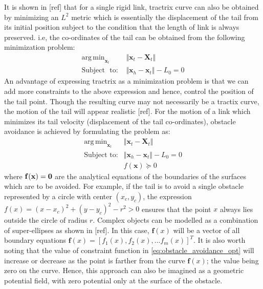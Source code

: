 \documentclass[12pt,a4]{article}
\DeclareMathOperator*{\argmin}{arg\,min}
\begin{document}
It is shown in [ref] that for a single rigid link, tractrix curve can also be obtained by minimizing an $L^2$ metric which is essentially the displacement of the tail from its initial position subject to the condition that the length of link is always preserved. i.e, the co-ordinates of the tail can be obtained from the following minimization problem:
\begin{align} \label{eq:Opt_prob_main}
\argmin_{\textbf{x}_t} &\Vert \textbf{x}_t-\textbf{X}_t \Vert\\
\text{Subject~ to:  } &\Vert \textbf{x}_h - \textbf{x}_t \Vert -L_0 = 0 \nonumber
\end{align}
An advantage of expressing tractrix as a minimization problem is that we can add more constraints to the above expression and hence, control the position of the tail point. Though the resulting curve may not necessarily be a tractix curve, the motion of the tail will appear realistic [ref]. For the motion of a link which minimizes its tail velocity (displacement of the tail co-ordinates), obstacle avoidance is achieved by formulating the problem as:
\begin{align} \label{eq:obstacle_avoidance_opt}
\argmin_{\textbf{x}_t} &\Vert \textbf{x}_t-\textbf{X}_t \Vert\\
\text{Subject to:} 
&\Vert \textbf{x}_h - \textbf{x}_t \Vert -L_0 = 0 \nonumber \\ 
~~ &f(\textbf{x}) \succeq 0  \nonumber
\end{align}
where $\bf{f}(x) = 0$ are the analytical equations of the boundaries of the surfaces which are to be avoided. For example, if the tail is to avoid a single obstacle represented by a circle with center $(x_c,y_c)$, the expression $f(x) = (x-x_c)^2+(y-y_c)^2-r^2>0$ ensures that the point $x$ always lies outside the circle of radius $r$. Complex objects can be modelled as a combination of super-ellipses as shown in [ref]. In this case, $\textbf{f}(x)$ will be a vector of all boundary equations $\textbf{f}(x) = [f_1(x),f_2(x),...f_m(x)]^T$. It is also worth noting that the value of constraint function in \cref{eq:obstacle_avoidance_opt} will increase or decrease as the point is farther from the curve $\textbf{f}(x)$; the value being zero on the curve. Hence, this approach can also be imagined as a geometric potential field, with zero potential only at the surface of the obstacle. 
\end{document}
